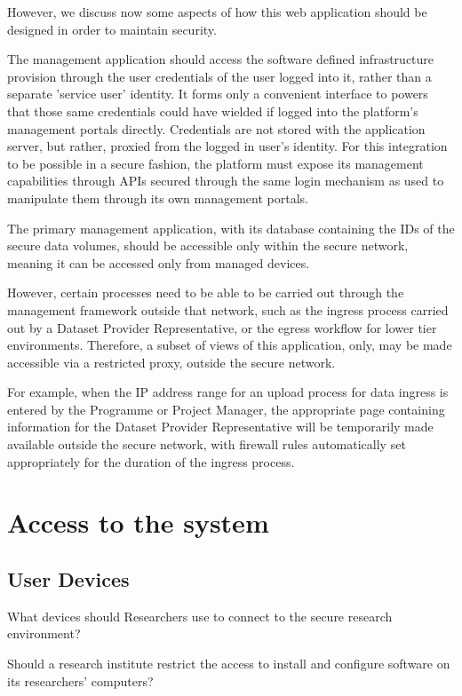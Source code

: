 \documentclass[10pt,a4paper,twocolumn]{article}
\begin{document}
However, we discuss now some aspects of how this web application should be designed in order to maintain security.

The management application should access the software defined infrastructure provision through the user credentials of the user logged into it, rather than a separate 'service user' identity. It forms only a convenient interface to powers that those same credentials could have wielded if logged into the platform's management portals directly. Credentials are not stored with the application server, but rather, proxied from the logged in user's identity.
For this integration to be possible in a secure fashion, the platform must expose its management capabilities through APIs secured through the same login mechanism as used to manipulate them through its own management portals. 

The primary management application, with its database containing the IDs of the secure data volumes,
should be accessible only within the secure network, meaning it can be accessed only from managed devices.

However, certain processes need to be able to be carried out through the management framework outside that network, such as the ingress process carried out by a Dataset Provider Representative, or the egress workflow for lower tier environments. Therefore, a subset of views of this application, only, may be made accessible via a restricted proxy, outside the secure network. 

For example, when the IP address range for an upload process for data ingress is entered by the Programme or Project Manager, the appropriate page containing information for the Dataset Provider Representative will be temporarily made available outside the secure network, with firewall rules automatically set appropriately for the duration of the ingress process.

\section{Access to the system}

\subsection{User Devices}

What devices should Researchers use to connect to the secure research environment?

Should a research institute restrict the access to install and configure software on its researchers' computers?
\end{document}
